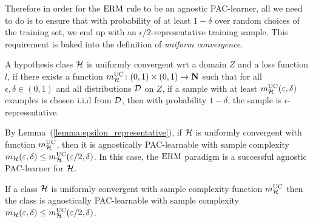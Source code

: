 Therefore in order for the $\operatorname{ERM}$ rule to be an agnostic PAC-learner, all we
need to do is to ensure that with probability of at least $1 - \delta$ over
random choices of the training set, we end up with an
$\epsilon/2$-representative training sample. This requirement is baked into
the definition of \emph{uniform convergence}.

\begin{definition}
A hypothesis class $\mathcal{H}$ is uniformly convergent wrt a domain $Z$
and a loss function $l$, if there exists a function
$m_{\mathcal{H}}^{\text{UC}} \colon (0, 1) \times (0, 1) \rightarrow \mathbf{N}$ such that
for all $\epsilon, \delta \in (0, 1)$ and all distributions $\mathcal{D}$ on $Z$,
if a sample with at least $m_{\mathcal{H}}^{\text{UC}}(\varepsilon, \delta)$ examples is chosen
i.i.d from $\mathcal{D}$, then with probability $1 - \delta$, the sample is
$\epsilon$-representative.
\end{definition}

By Lemma~(\ref{lemma:epsilon_representative}), if $\mathcal{H}$ is uniformly
convergent with function $m_{\mathcal{H}}^{\text{UC}}$, then it is agnostically PAC-learnable
with sample complexity $m_{\mathcal{H}}(\varepsilon, \delta) \leq
m_{\mathcal{H}}^{\text{UC}}(\varepsilon / 2, \delta)$. In this case, the $\operatorname{ERM}$ paradigm is a
successful agnostic PAC-learner for $\mathcal{H}$.
\begin{corollary} \label{cor:uniform_convergence}
If a class $\mathcal{H}$ is uniformly convergent with sample complexity function
$m_{\mathcal{H}}^{\text{UC}}$ then the class is agnostically PAC-learnable with sample complexity
$m_{\mathcal{H}}(\varepsilon, \delta) \leq m_{\mathcal{H}}^{\text{UC}}(\varepsilon / 2, \delta)$.
\end{corollary}

